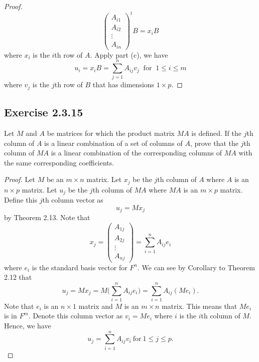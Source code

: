 \begin{enumerate}
\begin{proof}
\[\begin{pmatrix}
            {A}_{i1 } \\ 
            {A}_{i2} \\
            \vdots \\
            {A}_{in }
        \end{pmatrix}^{t} B = {x}_{i} B  \]
        where \( {x}_{i}  \) is the \( i   \)th row of \( A  \). Apply part (c), we have
        \[  {u}_{i} = {x}_{i} B = \sum_{ j=1  }^{ n } {A}_{ij} {v}_{j} \ \text{ for } \  1 \leq i \leq m \]
        where \( {v}_{j}  \) is the \( j \)th row of \( B  \) that has dimensions \( 1 \times  p  \).
        \end{proof}

\end{enumerate}


\subsection*{Exercise 2.3.15} Let \( M  \) and \( A  \) be matrices for which the product matrix \( MA  \) is defined. If the \( j \)th column of \( A  \) is a linear combination of a set of columns of \( A  \), prove that the \( j \)th column of \( MA  \) is a linear combination of the corresponding columns of \( MA  \) with the same corresponding coefficients.
\begin{proof}
   Let \( M  \) be an \( m \times n  \) matrix. Let \( {x}_{j}  \) be the \( j \)th column of \( A  \) where \( A  \) is an \( n \times p  \) matrix. Let \( {u}_{j}  \) be the \( j \)th column of \( MA  \) where \( MA  \) is an \( m \times p  \) matrix. Define this \( j \)th column vector as 
   \[  {u}_{j} = M {x}_{j} \]
   by Theorem 2.13. Note that
   \[  {x}_{j} = \begin{pmatrix}
       {A}_{1j } \\
       {A}_{2j } \\
       \vdots \\
       {A}_{nj}
   \end{pmatrix} = \sum_{ i=1  }^{ n } {A}_{ij} {e}_{i} \]
   where \( {e}_{i}  \) is the standard basis vector for \( F^{n} \). We can see by Corollary to Theorem 2.12 that
   \[  {u}_{j} = M {x}_{j} = M \Big( \sum_{ i=1  }^{ n } {A}_{ij} {e}_{i}  \Big) = \sum_{ i=1  }^{ n } {A}_{ij} (M {e}_{i}). \]
   Note that \( {e}_{i}  \) is an \( n \times 1  \) matrix and \( M  \) is an \( m \times n  \) matrix. This means that \( M {e}_{i} \) is in \( F^{m} \). Denote this column vector as \( {v}_{i} = M {e}_{i}  \) where \( i  \) is the \( i \)th column of \( M  \). Hence, we have
   \[  {u}_{j} = \sum_{ i=1  }^{ n } {A}_{ij} {v}_{i} \ \text{for} \ 1 \leq j \leq  p. \]
\end{proof}

